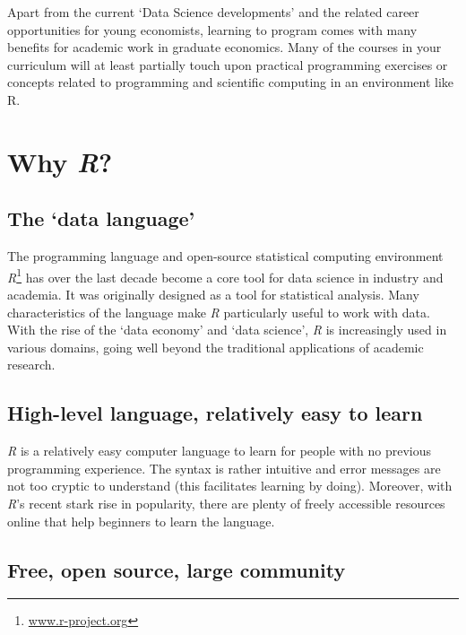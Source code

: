 \documentclass[
  12pt,
]{style/krantz}
\renewcommand{\href}[2]{#2\footnote{\url{#1}}}
\begin{document}
Apart from the current `Data Science developments' and the related career opportunities for young economists, learning to program comes with many benefits for academic work in graduate economics. Many of the courses in your curriculum will at least partially touch upon practical programming exercises or concepts related to programming and scientific computing in an environment like R.

\hypertarget{why-r}{%
\section{\texorpdfstring{Why \emph{R}?}{Why R?}}\label{why-r}}

\hypertarget{the-data-language}{%
\subsection{The `data language'}\label{the-data-language}}

The programming language and open-source statistical computing environment \href{www.r-project.org}{\emph{R}} has over the last decade become a core tool for data science in industry and academia. It was originally designed as a tool for statistical analysis. Many characteristics of the language make \emph{R} particularly useful to work with data. With the rise of the `data economy' and `data science', \emph{R} is increasingly used in various domains, going well beyond the traditional applications of academic research.

\hypertarget{high-level-language-relatively-easy-to-learn}{%
\subsection{High-level language, relatively easy to learn}\label{high-level-language-relatively-easy-to-learn}}

\emph{R} is a relatively easy computer language to learn for people with no previous programming experience. The syntax is rather intuitive and error messages are not too cryptic to understand (this facilitates learning by doing). Moreover, with \emph{R}'s recent stark rise in popularity, there are plenty of freely accessible resources online that help beginners to learn the language.

\hypertarget{free-open-source-large-community}{%
\subsection{Free, open source, large community}\label{free-open-source-large-community}}
\end{document}
